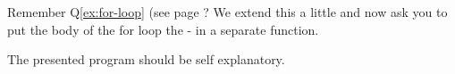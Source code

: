 \begin{Exercise}[title={For-loop II},difficulty=0]
\label{ex:for-loop II}
\Question Remember Q\ref{ex:for-loop} (see page \pageref{ex;for-loop}?
We extend this a little and now ask you to put the body of the for loop
the  - in a separate function.
\end{Exercise}

\begin{Answer}
\begin{minipage}{\textwidth}

\end{minipage}

The presented program should be self explanatory.
\end{Answer}
